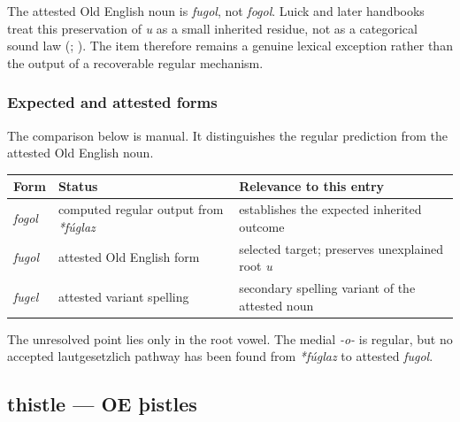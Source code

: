 \documentclass[
  british,
  a4paper,
]{article}
\newcounter{none} %
\begin{document}
The attested Old English noun is \emph{fugol}, not \emph{fogol}. Luick
and later handbooks treat this preservation of \emph{u} as a small
inherited residue, not as a categorical sound law
(;
). The item
therefore remains a genuine lexical exception rather than the output of
a recoverable regular mechanism.

\subsubsection{Expected and attested
forms}\label{expected-and-attested-forms}

The comparison below is manual. It distinguishes the regular prediction
from the attested Old English noun.

{\def\LTcaptype{none} %
\begin{longtable}[]{@{}
  >{\raggedright\arraybackslash}p{}
  >{\raggedright\arraybackslash}p{}
  >{\raggedright\arraybackslash}p{}@{}}
\toprule\noalign{}
\begin{minipage}[b]{\linewidth}\raggedright
Form
\end{minipage} & \begin{minipage}[b]{\linewidth}\raggedright
Status
\end{minipage} & \begin{minipage}[b]{\linewidth}\raggedright
Relevance to this entry
\end{minipage} \\
\midrule\noalign{}
\endhead
\bottomrule\noalign{}
\endlastfoot
\emph{fogol} & computed regular output from \emph{*fúglaz} & establishes
the expected inherited outcome \\
\emph{fugol} & attested Old English form & selected target; preserves
unexplained root \emph{u} \\
\emph{fugel} & attested variant spelling & secondary spelling variant of
the attested noun \\
\end{longtable}
}

The unresolved point lies only in the root vowel. The medial \emph{-o-}
is regular, but no accepted lautgesetzlich pathway has been found from
\emph{*fúglaz} to attested \emph{fugol}.

\subsection{thistle --- OE þistles}\label{thistle-oe-uxfeistles}
\end{document}
